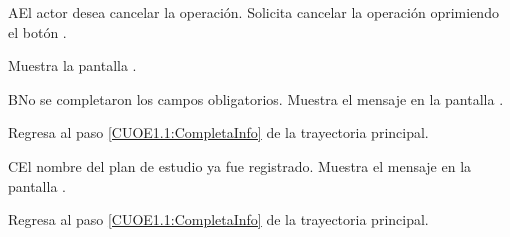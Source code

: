 \begin{UCtrayectoriaA}{A}{El actor desea cancelar la operación.}
	\UCpaso [\UCactor] Solicita cancelar la operación oprimiendo el botón .
	
	\UCpaso [\UCsist] Muestra la pantalla . 
\end{UCtrayectoriaA}

\begin{UCtrayectoriaA}{B}{No se completaron los campos obligatorios.}
	\UCpaso [\UCsist] Muestra el mensaje  en la pantalla .
	
	\UCpaso Regresa al paso \ref{CUOE1.1:CompletaInfo} de la trayectoria principal.
\end{UCtrayectoriaA}

\begin{UCtrayectoriaA}{C}{El nombre del plan de estudio ya fue registrado.}
	\UCpaso [\UCsist] Muestra el mensaje  en la pantalla .
	
	\UCpaso Regresa al paso \ref{CUOE1.1:CompletaInfo} de la trayectoria principal.
\end{UCtrayectoriaA}

